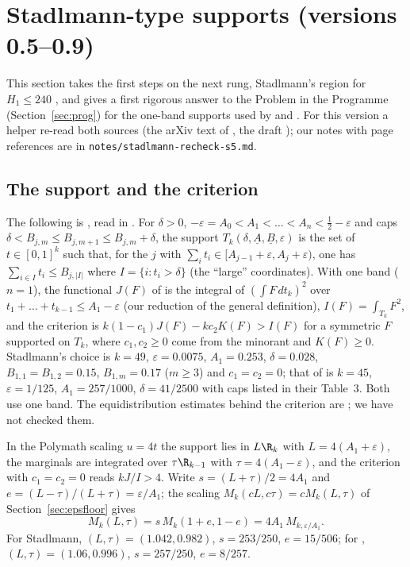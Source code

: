 \section{Stadlmann-type supports (versions 0.5--0.9)}\label{sec:stad}

This section takes the first steps on the next rung, Stadlmann's region for
$H_1\le240$ \cite{Sta26}, and gives a first rigorous answer to the Problem in
the Programme (Section~\ref{sec:prog}) for the one-band supports used by \cite{Sta26} and \cite{Cha26}.
For this version a helper re-read both sources (the arXiv text of
\cite{Sta26}, the draft \cite{Cha26}); our notes with page references are in
\texttt{notes/stadlmann-recheck-s5.md}.

\subsection*{The support and the criterion}
The following is , read in \cite[Def.~1, Def.~5, Prop.~1]{Sta26}.
For $\delta>0$, $-\varepsilon=A_0<A_1<\dots<A_n<\frac12-\varepsilon$ and caps
$\delta<B_{j,m}\le B_{j,m+1}\le B_{j,m}+\delta$, the support
$T_k(\delta,\underline A,\underline B,\varepsilon)$ is the set of
$t\in[0,1]^k$ such that, for the $j$ with
$\sum_it_i\in[A_{j-1}+\varepsilon,A_j+\varepsilon)$, one has
$\sum_{i\in I}t_i\le B_{j,|I|}$ where $I=\{i:t_i>\delta\}$ (the ``large''
coordinates). With one band ($n=1$), the functional $J(F)$ of \cite{Sta26}
is the integral of $\left(\int F\,dt_k\right)^2$ over
$t_1+\dots+t_{k-1}\le A_1-\varepsilon$ (our reduction of the general
definition), $I(F)=\int_{T_k}F^2$, and the criterion is
$k(1-c_1)J(F)-kc_2K(F)>I(F)$ for a symmetric $F$ supported on $T_k$, where
$c_1,c_2\ge0$ come from the minorant and $K(F)\ge0$. Stadlmann's choice is
$k=49$, $\varepsilon=0.0075$, $A_1=0.253$, $\delta=0.028$,
$B_{1,1}=B_{1,2}=0.15$, $B_{1,m}=0.17$ ($m\ge3$) and $c_1=c_2=0$; that of
\cite{Cha26} is $k=45$, $\varepsilon=1/125$, $A_1=257/1000$,
$\delta=41/2500$ with caps listed in their Table~3. Both use one band. The
equidistribution estimates behind the criterion are ; we have not
checked them.

In the Polymath scaling $u=4t$ the support lies in $L\R_k$ with
$L=4(A_1+\varepsilon)$, the marginals are integrated over $\tau\R_{k-1}$ with
$\tau=4(A_1-\varepsilon)$, and the criterion with $c_1=c_2=0$ reads
$kJ/I>4$. Write $s=(L+\tau)/2=4A_1$ and $e=(L-\tau)/(L+\tau)=\varepsilon/A_1$;
the scaling $M_k(cL,c\tau)=cM_k(L,\tau)$ of Section~\ref{sec:epsfloor} gives
\begin{equation}\label{eq:dil}
M_k(L,\tau)=s\,M_k(1+e,1-e)=4A_1\,M_{k,\varepsilon/A_1}.
\end{equation}
For Stadlmann, $(L,\tau)=(1.042,0.982)$, $s=253/250$, $e=15/506$; for
\cite{Cha26}, $(L,\tau)=(1.06,0.996)$, $s=257/250$, $e=8/257$.

